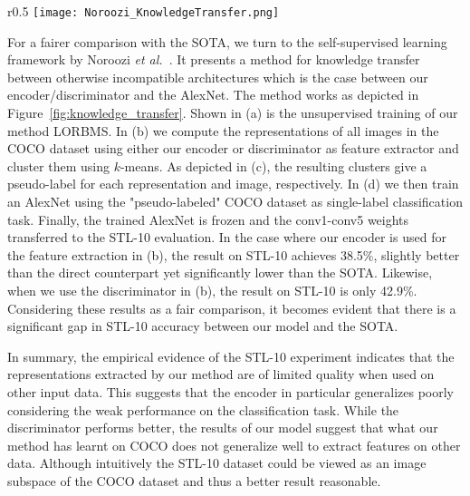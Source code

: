 \documentclass[a4paper,12pt]{report}
\begin{document}
\begin{wrapfigure}{r}{0.5\textwidth}
\texttt{[image: Noroozi\_KnowledgeTransfer.png]} 
\caption{Knowledge transfer from the LORBMS model to the AlexNet model (adapted from \cite{KnowledgeTransfer}).} 
\label{fig:knowledge_transfer}
\end{wrapfigure}
For a fairer comparison with the SOTA, we turn to the self-supervised learning framework by Noroozi \textit{et al.}~\cite{KnowledgeTransfer}. It presents a method for knowledge transfer between otherwise incompatible architectures which is the case between our encoder/discriminator and the AlexNet. The method works as depicted in Figure~\ref{fig:knowledge_transfer}. Shown in (a) is the unsupervised training of our method LORBMS. In (b) we compute the representations of all images in the COCO dataset using either our encoder or discriminator as feature extractor and cluster them using $k$-means. As depicted in (c), the resulting clusters give a pseudo-label for each representation and image, respectively. In (d) we then train an AlexNet using the "pseudo-labeled" COCO dataset as single-label classification task. Finally, the trained AlexNet is frozen and the conv1-conv5 weights transferred to the STL-10 evaluation. In the case where our encoder is used for the feature extraction in (b), the result on STL-10 achieves 38.5\%, slightly better than the direct counterpart yet significantly lower than the SOTA. Likewise, when we use the discriminator in (b), the result on STL-10 is only 42.9\%. Considering these results as a fair comparison, it becomes evident that there is a significant gap in STL-10 accuracy between our model and the SOTA.

In summary, the empirical evidence of the STL-10 experiment indicates that the representations extracted by our method are of limited quality when used on other input data. This suggests that the encoder in particular generalizes poorly considering the weak performance on the classification task. While the discriminator performs better, the results of our model suggest that what our method has learnt on COCO does not generalize well to extract features on other data. Although intuitively the STL-10 dataset could be viewed as an image subspace of the COCO dataset and thus a better result reasonable.
\end{document}
